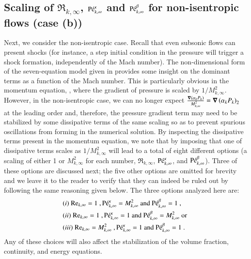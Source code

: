 \documentclass[preprint,10pt]{elsarticle}
\begin{document}
\subsection{Scaling of $\Re_{k,\infty}$, $\textrm{P\'e}_{k,\infty}^\kappa$ and $\textrm{P\'e}_{k,\infty}^\beta$ for non-isentropic flows (case (b))}\label{eq:non_isent_flows}
Next, we consider the non-isentropic case. Recall that even subsonic flows can present shocks (for instance, 
a step initial condition in the pressure will trigger a shock formation, independently of the Mach number). 
The non-dimensional form of the seven-equation model given in  provides some insight on the 
dominant terms as a function of the Mach number. This is particularly obvious in the momentum equation, , 
where the gradient of pressure is scaled by $1/M_{k,\infty}^2$. However, in the non-isentropic case, we can no longer 
expect $\frac{\boldsymbol\nabla \left( \alpha_k P_k \right)}{M_{k,\infty}^2}=\boldsymbol\nabla \left( \alpha_k P_k \right)_2$ at the leading order and, 
therefore, the pressure gradient term may need to be stabilized by 
some dissipative terms of the same scaling so as to prevent spurious oscillations from forming in the numerical solution. 
By inspecting the dissipative terms present in the momentum equation, we note that by imposing that one of dissipative terms 
scales as $1/M_{k,\infty}^2$ will lead to a total of eight different options (a scaling of either 1 or $M^2_{k,\infty}$ for each number, 
$\Re_{k,\infty}$, $\textrm{P\'e}_{k,\infty}^\kappa$, and $\textrm{P\'e}_{k,\infty}^\beta$). Three of these options are discussed next; the five other 
options are omitted for brevity and we leave it to the reader to verify that they can indeed be ruled out by following the same reasoning given below. 
The three options analyzed here are:
%
\begin{align}
&(i) \ \textrm{Re}_{k,\infty} = 1 \ , \textrm{P\'e}_{k,\infty}^\kappa = M_{k,\infty}^2 \text{ and } \textrm{P\'e}_{k,\infty}^\beta = 1 \ , \nonumber \\
&(ii) \ \textrm{Re}_{k,\infty} = 1 \ , \textrm{P\'e}_{k,\infty}^\kappa = 1 \text{ and } \textrm{P\'e}_{k,\infty}^\beta = M_{k,\infty}^2 \text{ or } \nonumber \\
&(iii) \ \textrm{Re}_{k,\infty} = M_{k,\infty}^2 \ , \textrm{P\'e}_{k,\infty}^\kappa = 1 \text{ and } \textrm{P\'e}_{k,\infty}^\beta = 1 \ . \nonumber
\end{align}
%
Any of these choices will also affect the stabilization of the volume fraction, continuity, and energy equations. 
\end{document}
